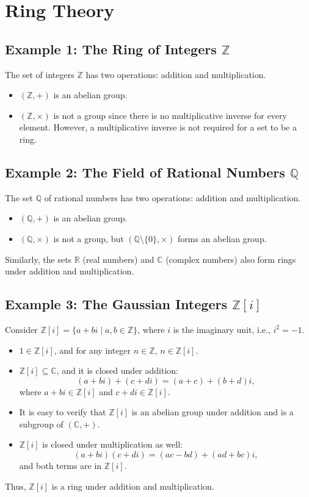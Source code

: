\documentclass{article}
\begin{document}
\section{Ring Theory}
\subsection*{Example 1: The Ring of Integers \(\mathbb{Z}\)}
The set of integers \(\mathbb{Z}\) has two operations: addition and multiplication.
\begin{itemize}
    \item \((\mathbb{Z}, +)\) is an abelian group.
    \item \((\mathbb{Z}, \times)\) is not a group since there is no multiplicative inverse for every element. However, a multiplicative inverse is not required for a set to be a ring.
\end{itemize}

\subsection*{Example 2: The Field of Rational Numbers \(\mathbb{Q}\)}
The set \(\mathbb{Q}\) of rational numbers has two operations: addition and multiplication.
\begin{itemize}
    \item \((\mathbb{Q}, +)\) is an abelian group.
    \item \((\mathbb{Q}, \times)\) is not a group, but \((\mathbb{Q} \setminus \{0\}, \times)\) forms an abelian group.
\end{itemize}

Similarly, the sets \(\mathbb{R}\) (real numbers) and \(\mathbb{C}\) (complex numbers) also form rings under addition and multiplication.

\subsection*{Example 3: The Gaussian Integers \(\mathbb{Z}[i]\)}
Consider \(\mathbb{Z}[i] = \{a + bi \mid a, b \in \mathbb{Z}\}\), where \(i\) is the imaginary unit, i.e., \(i^2 = -1\).
\begin{itemize}
    \item \(1 \in \mathbb{Z}[i]\), and for any integer \(n \in \mathbb{Z}\), \(n \in \mathbb{Z}[i]\).
    \item \(\mathbb{Z}[i] \subseteq \mathbb{C}\), and it is closed under addition:
    \[
    (a + bi) + (c + di) = (a + c) + (b + d)i,
    \]
    where \(a + bi \in \mathbb{Z}[i]\) and \(c + di \in \mathbb{Z}[i]\).
    \item It is easy to verify that \(\mathbb{Z}[i]\) is an abelian group under addition and is a subgroup of \((\mathbb{C}, +)\).
    \item \(\mathbb{Z}[i]\) is closed under multiplication as well:
    \[
    (a + bi)(c + di) = (ac - bd) + (ad + bc)i,
    \]
    and both terms are in \(\mathbb{Z}[i]\).
\end{itemize}
Thus, \(\mathbb{Z}[i]\) is a ring under addition and multiplication.
\end{document}
